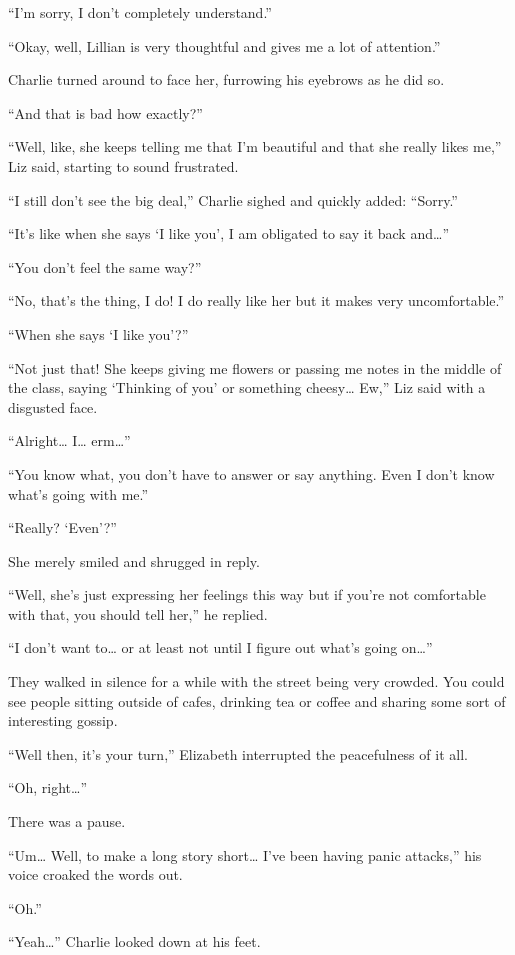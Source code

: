 “I'm sorry, I don't completely understand.”

“Okay, well, Lillian is very thoughtful and gives me a lot of attention.”

Charlie turned around to face her, furrowing his eyebrows as he did so.

“And that is bad how exactly?”

“Well, like, she keeps telling me that I'm beautiful and that she really likes me,” Liz said, starting to sound frustrated.

“I still don't see the big deal,” Charlie sighed and quickly added: “Sorry.”

“It's like when she says ‘I like you', I am obligated to say it back and…”

“You don't feel the same way?”

“No, that's the thing, I do! I do really like her but it makes very uncomfortable.”

“When she says ‘I like you'?”

“Not just that! She keeps giving me flowers or passing me notes in the middle of the class, saying ‘Thinking of you' or something cheesy… Ew,” Liz said with a disgusted face.

“Alright… I… erm…”

“You know what, you don't have to answer or say anything. Even I don't know what's going with me.”

“Really? ‘Even'?”

She merely smiled and shrugged in reply.

“Well, she's just expressing her feelings this way but if you're not comfortable with that, you should tell her,” he replied.

“I don't want to… or at least not until I figure out what's going on…”

They walked in silence for a while with the street being very crowded. You could see people sitting outside of cafes, drinking tea or coffee and sharing some sort of interesting gossip.

“Well then, it's your turn,” Elizabeth interrupted the peacefulness of it all.

“Oh, right…”

There was a pause.

“Um… Well, to make a long story short… I've been having panic attacks,” his voice croaked the words out.

“Oh.”

“Yeah…” Charlie looked down at his feet.

